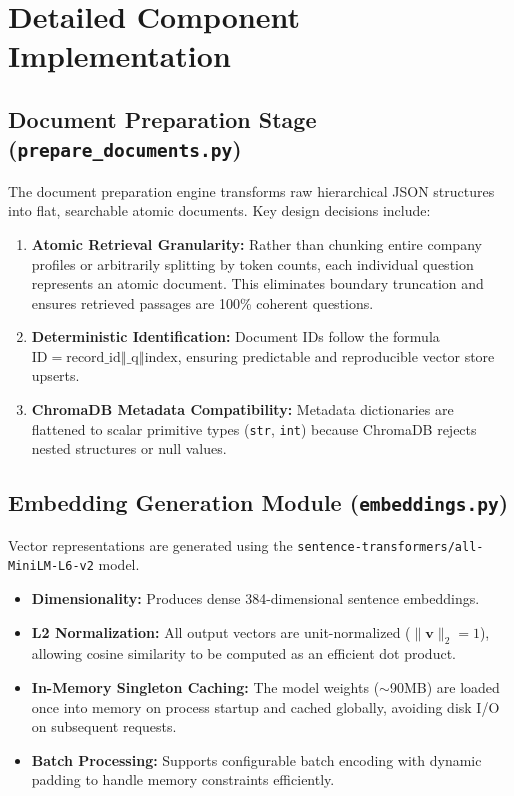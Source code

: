 \documentclass[11pt]{article}
\begin{document}
\section{Detailed Component Implementation}

\subsection{Document Preparation Stage (\texttt{prepare\_documents.py})}
The document preparation engine transforms raw hierarchical JSON structures into flat, searchable atomic documents. Key design decisions include:
\begin{enumerate}[leftmargin=1.5em]
    \item \textbf{Atomic Retrieval Granularity:} Rather than chunking entire company profiles or arbitrarily splitting by token counts, each individual question represents an atomic document. This eliminates boundary truncation and ensures retrieved passages are 100\% coherent questions.
    \item \textbf{Deterministic Identification:} Document IDs follow the formula $\text{ID} = \text{record\_id} \mathbin{\Vert} \text{\_q} \mathbin{\Vert} \text{index}$, ensuring predictable and reproducible vector store upserts.
    \item \textbf{ChromaDB Metadata Compatibility:} Metadata dictionaries are flattened to scalar primitive types (\texttt{str}, \texttt{int}) because ChromaDB rejects nested structures or null values.
\end{enumerate}

\subsection{Embedding Generation Module (\texttt{embeddings.py})}
Vector representations are generated using the \texttt{sentence-transformers/all-MiniLM-L6-v2} model.
\begin{itemize}[leftmargin=1.5em]
    \item \textbf{Dimensionality:} Produces dense 384-dimensional sentence embeddings.
    \item \textbf{L2 Normalization:} All output vectors are unit-normalized ($\|\mathbf{v}\|_2 = 1$), allowing cosine similarity to be computed as an efficient dot product.
    \item \textbf{In-Memory Singleton Caching:} The model weights ($\sim$90MB) are loaded once into memory on process startup and cached globally, avoiding disk I/O on subsequent requests.
    \item \textbf{Batch Processing:} Supports configurable batch encoding with dynamic padding to handle memory constraints efficiently.
\end{itemize}
\end{document}
